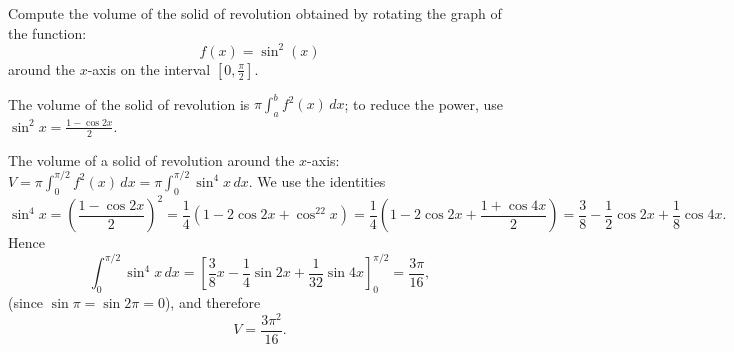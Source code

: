 
\begin{question}
Compute the volume of the solid of revolution obtained by rotating the graph of the function:
\[ f(x)=\sin^2(x) \]
around the $x$-axis on the interval $[0,\frac\pi2]$.
\end{question}

\begin{hint}
The volume of the solid of revolution is $\pi\int_a^b f^2(x)\,dx$; to reduce the power, use $\sin^2x=\frac{1-\cos2x}{2}$.
\end{hint}

\begin{solution}
The volume of a solid of revolution around the $x$-axis: $V=\pi\int_0^{\pi/2}f^2(x)\,dx=\pi\int_0^{\pi/2}\sin^4x\,dx$. We use the identities
\[ \sin^4x=\left(\frac{1-\cos2x}{2}\right)^2=\frac14\left(1-2\cos2x+\cos^22x\right)=\frac14\left(1-2\cos2x+\frac{1+\cos4x}{2}\right)=\frac38-\frac12\cos2x+\frac18\cos4x. \]
Hence
\[ \int_0^{\pi/2}\sin^4x\,dx=\left[\frac38x-\frac14\sin2x+\frac1{32}\sin4x\right]_0^{\pi/2}=\frac{3\pi}{16}, \]
(since $\sin\pi=\sin2\pi=0$), and therefore
\[ \boxed{V=\frac{3\pi^2}{16}}. \]
\end{solution}
